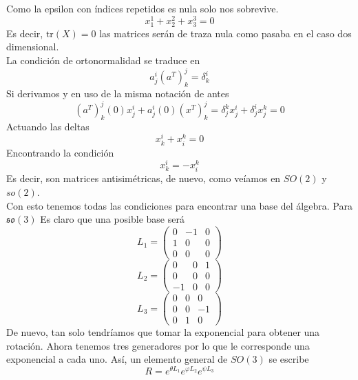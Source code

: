 \documentclass[12pt]{article}
\begin{document}
Como la epsilon con índices repetidos es nula solo nos sobrevive.
\begin{equation}
	x_1^1+x_2^2+x_3^3=0
\end{equation}
Es decir, $\text{tr}(X)=0$ las matrices serán de traza nula como pasaba en el caso dos dimensional. \\
La condición de ortonormalidad se traduce en
\begin{equation}
	a^i_j(a^T)^j_k=\delta^i_k
\end{equation}
Si derivamos y en uso de la misma notación de antes
\begin{equation}
	(a^T)^j_k(0)x^i_j+a^i_j(0)(x^T)^j_k=\delta^k_jx^i_j+\delta^i_jx^k_j=0
\end{equation}
Actuando las deltas
\begin{equation}
	x^i_k+x^k_i=0
\end{equation}
Encontrando la condición
\begin{equation}
	x^i_k=-x^k_i
\end{equation}
Es decir, son matrices antisimétricas, de nuevo, como veíamos en $SO(2)$ y $so(2)$. \\
Con esto tenemos todas las condiciones para encontrar una base del álgebra. Para $\mathfrak{s}\mathfrak{o}(3)$ Es claro que una posible base será
\begin{equation}
	L_1=\begin{pmatrix}
		0 & -1 & 0 \\ 1 & 0 & 0\\ 0&0&0
	\end{pmatrix}
\end{equation}
\begin{equation}
	L_2=\begin{pmatrix}
		0 & 0 & 1 \\ 0 & 0 & 0\\ -1&0&0
	\end{pmatrix}
\end{equation}
\begin{equation}
	L_3=\begin{pmatrix}
		0 & 0 & 0 \\ 0 & 0 & -1\\ 0&1&0
	\end{pmatrix}
\end{equation}
De nuevo, tan solo tendríamos que tomar la exponencial para obtener una rotación. Ahora tenemos tres generadores por lo que le corresponde una exponencial a cada uno. Así, un elemento general de $SO(3)$ se escribe
\begin{equation}
    R=e^{\theta L_1}e^{\varphi L_2}e^{\psi L_3}
\end{equation}
\end{document}
